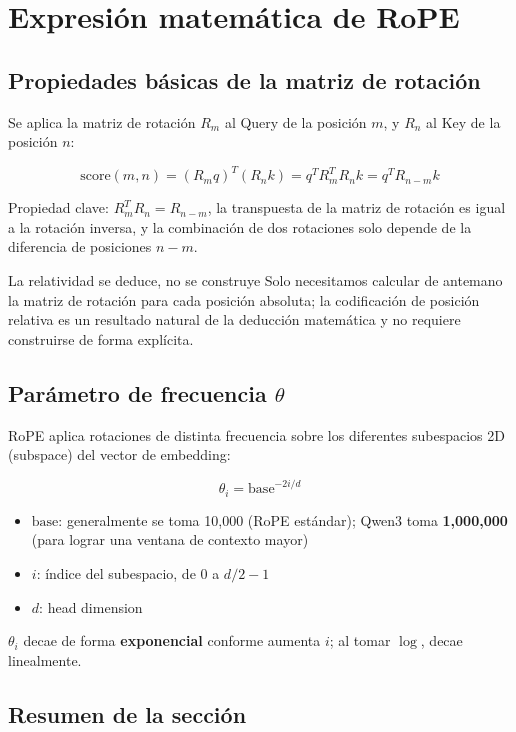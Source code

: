 \documentclass[a4paper]{article}
\begin{document}
\section{Expresión matemática de RoPE}

\subsection{Propiedades básicas de la matriz de rotación}

Se aplica la matriz de rotación $R_m$ al Query de la posición $m$, y $R_n$ al Key de la posición $n$:

$$
\text{score}(m, n) = (R_m q)^T (R_n k) = q^T R_m^T R_n k = q^T R_{n-m} k
$$

Propiedad clave: $R_m^T R_n = R_{n-m}$, la transpuesta de la matriz de rotación es igual a la rotación inversa, y la combinación de dos rotaciones solo depende de la diferencia de posiciones $n - m$.

\begin{warningbox}{La relatividad se deduce, no se construye}
Solo necesitamos calcular de antemano la matriz de rotación para cada posición absoluta; la codificación de posición relativa es un resultado natural de la deducción matemática y no requiere construirse de forma explícita.
\end{warningbox}

\subsection{Parámetro de frecuencia $\theta$}

RoPE aplica rotaciones de distinta frecuencia sobre los diferentes subespacios 2D (subspace) del vector de embedding:

$$
\theta_i = \text{base}^{-2i/d}
$$

\begin{itemize}
  \item $\text{base}$: generalmente se toma 10,000 (RoPE estándar); Qwen3 toma \textbf{1,000,000} (para lograr una ventana de contexto mayor)
  \item $i$: índice del subespacio, de 0 a $d/2 - 1$
  \item $d$: head dimension
\end{itemize}

$\theta_i$ decae de forma \textbf{exponencial} conforme aumenta $i$; al tomar $\log$, decae linealmente.

\subsection{Resumen de la sección}
\end{document}

